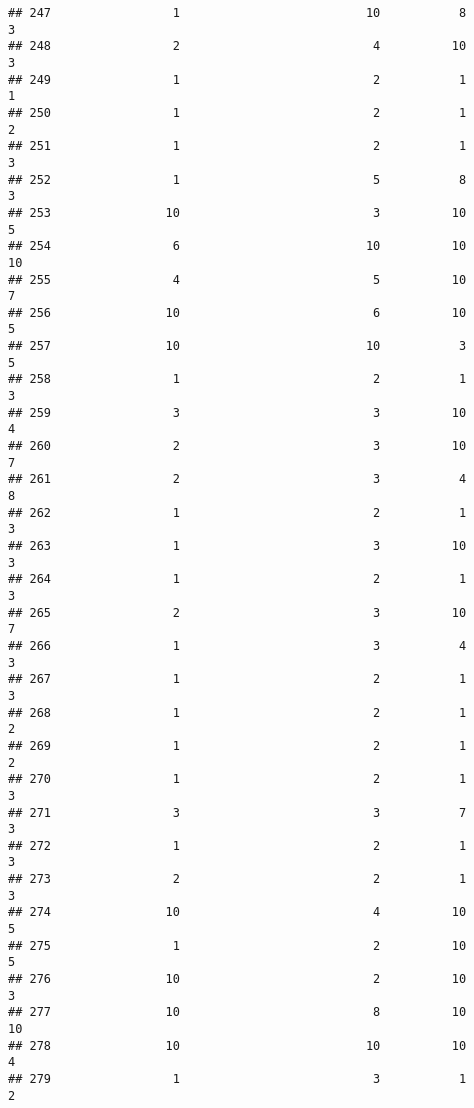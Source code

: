 \documentclass[
]{article}
\begin{document}
\begin{verbatim}
## 247                 1                          10           8               3
## 248                 2                           4          10               3
## 249                 1                           2           1               1
## 250                 1                           2           1               2
## 251                 1                           2           1               3
## 252                 1                           5           8               3
## 253                10                           3          10               5
## 254                 6                          10          10              10
## 255                 4                           5          10               7
## 256                10                           6          10               5
## 257                10                          10           3               5
## 258                 1                           2           1               3
## 259                 3                           3          10               4
## 260                 2                           3          10               7
## 261                 2                           3           4               8
## 262                 1                           2           1               3
## 263                 1                           3          10               3
## 264                 1                           2           1               3
## 265                 2                           3          10               7
## 266                 1                           3           4               3
## 267                 1                           2           1               3
## 268                 1                           2           1               2
## 269                 1                           2           1               2
## 270                 1                           2           1               3
## 271                 3                           3           7               3
## 272                 1                           2           1               3
## 273                 2                           2           1               3
## 274                10                           4          10               5
## 275                 1                           2          10               5
## 276                10                           2          10               3
## 277                10                           8          10              10
## 278                10                          10          10               4
## 279                 1                           3           1               2

\end{verbatim}
\end{document}
